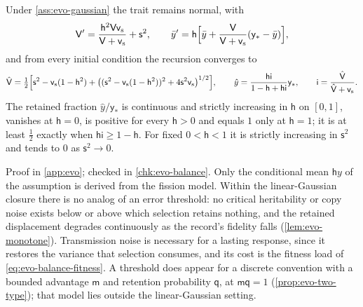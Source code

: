 \begin{proposition}\label{prop:evo-balance}
Under \cref{ass:evo-gaussian} the trait remains normal, with
\begin{equation}\label{eq:evo-balance-recursion}
\mathsf V'=\frac{\mathsf h^2\mathsf V\mathsf v_{\mathrm s}}{\mathsf V+\mathsf v_{\mathrm s}}+\mathsf s^2,\qquad\bar y'=\mathsf h\Bigl[\bar y+\frac{\mathsf V}{\mathsf V+\mathsf v_{\mathrm s}}(\mathsf y_\ast-\bar y)\Bigr],
\end{equation}
and from every initial condition the recursion converges to
\begin{equation}\label{eq:evo-balance-fixed}
\hat{\mathsf V}=\tfrac12\Bigl[\mathsf s^2-\mathsf v_{\mathrm s}(1-\mathsf h^2)+\bigl((\mathsf s^2-\mathsf v_{\mathrm s}(1-\mathsf h^2))^2+4\mathsf s^2\mathsf v_{\mathrm s}\bigr)^{1/2}\Bigr],\qquad\hat y=\frac{\mathsf h\mathsf i}{1-\mathsf h+\mathsf h\mathsf i}\mathsf y_\ast,\qquad\mathsf i=\frac{\hat{\mathsf V}}{\hat{\mathsf V}+\mathsf v_{\mathrm s}}.
\end{equation}
The retained fraction $\hat y/\mathsf y_\ast$ is continuous and strictly increasing in $\mathsf h$ on $[0,1]$, vanishes at $\mathsf h=0$, is positive for every $\mathsf h>0$ and equals $1$ only at $\mathsf h=1$; it is at least $\frac12$ exactly when $\mathsf h\mathsf i\ge1-\mathsf h$. For fixed $0<\mathsf h<1$ it is strictly increasing in $\mathsf s^2$ and tends to $0$ as $\mathsf s^2\to0$.
\end{proposition}

Proof in \cref{app:evo}; checked in \cref{chk:evo-balance}. Only the conditional mean $\mathsf hy$ of the assumption is derived from the fission model. Within the linear-Gaussian closure there is no analog of an error threshold: no critical heritability or copy noise exists below or above which selection retains nothing, and the retained displacement degrades continuously as the record's fidelity falls (\cref{lem:evo-monotone}). Transmission noise is necessary for a lasting response, since it restores the variance that selection consumes, and its cost is the fitness load of \eqref{eq:evo-balance-fitness}. A threshold does appear for a discrete convention with a bounded advantage $\mathsf m$ and retention probability $\mathsf q$, at $\mathsf m\mathsf q=1$ (\cref{prop:evo-two-type}); that model lies outside the linear-Gaussian setting.

